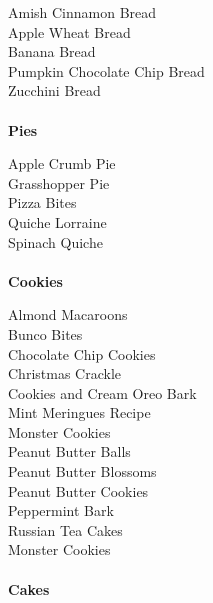 \documentclass[11pt, twoside, openany]{book}
\begin{document}
Amish Cinnamon Bread\hrulefill\pageref{amish-cinnamon-bread}\\
Apple Wheat Bread\hrulefill\pageref{apple-wheat-bread}\\
Banana Bread\hrulefill\pageref{banana-bread}\\
Pumpkin Chocolate Chip Bread\hrulefill\pageref{pumpkin-chocolate-chip-bread}\\
Zucchini Bread\hrulefill\pageref{zucchini-bread}\\
{~\vspace{2mm}\\ \Large \textbf{Pies}}\hfill\textbf{\pageref{pies}}

Apple Crumb Pie\hrulefill\pageref{apple-crumb-pie}\\
Grasshopper Pie\hrulefill\pageref{grasshopper-pie}\\
Pizza Bites\hrulefill\pageref{pizza-bites}\\
Quiche Lorraine\hrulefill\pageref{quiche-lorraine}\\
Spinach Quiche\hrulefill\pageref{spinach-quiche}\\
{~\vspace{2mm}\\ \Large \textbf{Cookies}}\hfill\textbf{\pageref{cookies}}

Almond Macaroons\hrulefill\pageref{almond-macaroons}\\
Bunco Bites\hrulefill\pageref{bunco-bites}\\
Chocolate Chip Cookies\hrulefill\pageref{chocolate-chip-cookies}\\
Christmas Crackle\hrulefill\pageref{christmas-crackle}\\
Cookies and Cream Oreo Bark\hrulefill\pageref{cookies-and-cream-oreo-bark}\\
Mint Meringues Recipe\hrulefill\pageref{mint-meringues-recipe}\\
Monster Cookies\hrulefill\pageref{monster-cookies}\\
Peanut Butter Balls\hrulefill\pageref{peanut-butter-balls}\\
Peanut Butter Blossoms\hrulefill\pageref{peanut-butter-blossoms}\\
Peanut Butter Cookies\hrulefill\pageref{peanut-butter-cookies}\\
Peppermint Bark\hrulefill\pageref{peppermint-bark}\\
Russian Tea Cakes\hrulefill\pageref{russian-tea-cakes}\\
Monster Cookies\hrulefill\pageref{monster-cookies}\\
{~\vspace{2mm}\\ \Large \textbf{Cakes}}\hfill\textbf{\pageref{cakes}}
\end{document}

